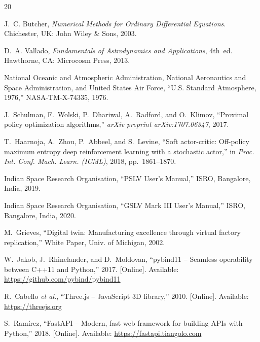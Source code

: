 \documentclass[conference]{IEEEtran}
\begin{document}
\begin{thebibliography}{20}

J.~C. Butcher, \textit{Numerical Methods for Ordinary Differential Equations}. Chichester, UK: John Wiley \& Sons, 2003.

D.~A. Vallado, \textit{Fundamentals of Astrodynamics and Applications}, 4th~ed. Hawthorne, CA: Microcosm Press, 2013.

National Oceanic and Atmospheric Administration, National Aeronautics and Space Administration, and United States Air Force, ``U.S. Standard Atmosphere, 1976,'' NASA-TM-X-74335, 1976.

J.~Schulman, F.~Wolski, P.~Dhariwal, A.~Radford, and O.~Klimov, ``Proximal policy optimization algorithms,'' \textit{arXiv preprint arXiv:1707.06347}, 2017.

T.~Haarnoja, A.~Zhou, P.~Abbeel, and S.~Levine, ``Soft actor-critic: Off-policy maximum entropy deep reinforcement learning with a stochastic actor,'' in \textit{Proc. Int. Conf. Mach. Learn. (ICML)}, 2018, pp.~1861--1870.

Indian Space Research Organisation, ``PSLV User's Manual,'' ISRO, Bangalore, India, 2019.

Indian Space Research Organisation, ``GSLV Mark III User's Manual,'' ISRO, Bangalore, India, 2020.

M.~Grieves, ``Digital twin: Manufacturing excellence through virtual factory replication,'' White Paper, Univ. of Michigan, 2002.

W.~Jakob, J.~Rhinelander, and D.~Moldovan, ``pybind11 -- Seamless operability between C++11 and Python,'' 2017. [Online]. Available: \url{https://github.com/pybind/pybind11}

R.~Cabello \textit{et al.}, ``Three.js -- JavaScript 3D library,'' 2010. [Online]. Available: \url{https://threejs.org}

S.~Ram\'{i}rez, ``FastAPI -- Modern, fast web framework for building APIs with Python,'' 2018. [Online]. Available: \url{https://fastapi.tiangolo.com}


\end{thebibliography}
\end{document}
